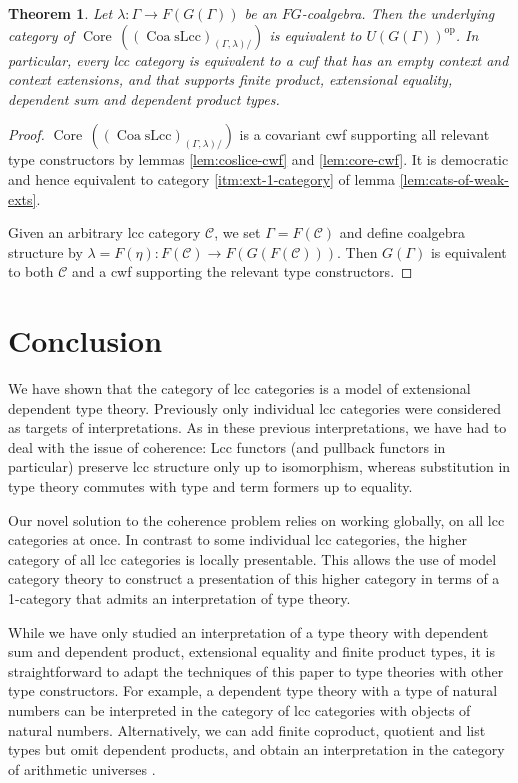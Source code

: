 \documentclass[a4paper]{article}
\newtheorem{theorem}{Theorem}
\theoremstyle{remark}
\theoremstyle{definition}
\begin{document}
\begin{theorem}
  \label{th:context-as-model}
  Let $\lambda : \Gamma \rightarrow F(G(\Gamma))$ be an $FG$-coalgebra.
  Then the underlying category of $\operatorname{Core} \, ((\operatorname{Coa} \mathrm{sLcc})_{(\Gamma, \lambda) /})$ is equivalent to $U(G(\Gamma))^\mathrm{op}$.
  In particular, every lcc category is equivalent to a cwf that has an empty context and context extensions, and that supports finite product, extensional equality, dependent sum and dependent product types.
\end{theorem}
\begin{proof}
  $\operatorname{Core} \, ((\operatorname{Coa} \mathrm{sLcc})_{(\Gamma, \lambda) /})$ is a covariant cwf supporting all relevant type constructors by lemmas \ref{lem:coslice-cwf} and \ref{lem:core-cwf}.
  It is democratic and hence equivalent to category \ref{itm:ext-1-category} of lemma \ref{lem:cats-of-weak-exts}.

  Given an arbitrary lcc category $\mathcal{C}$, we set $\Gamma = F(\mathcal{C})$ and define coalgebra structure by $\lambda = F(\eta) : F(\mathcal{C}) \rightarrow F(G(F(\mathcal{C})))$.
  Then $G(\Gamma)$ is equivalent to both $\mathcal{C}$ and a cwf supporting the relevant type constructors.
\end{proof}

\section{Conclusion}

We have shown that the category of lcc categories is a model of extensional dependent type theory.
Previously only individual lcc categories were considered as targets of interpretations.
As in these previous interpretations, we have had to deal with the issue of coherence:
Lcc functors (and pullback functors in particular) preserve lcc structure only up to isomorphism, whereas substitution in type theory commutes with type and term formers up to equality.

Our novel solution to the coherence problem relies on working globally, on all lcc categories at once.
In contrast to some individual lcc categories, the higher category of all lcc categories is locally presentable.
This allows the use of model category theory to construct a presentation of this higher category in terms of a 1-category that admits an interpretation of type theory.

While we have only studied an interpretation of a type theory with dependent sum and dependent product, extensional equality and finite product types, it is straightforward to adapt the techniques of this paper to type theories with other type constructors.
For example, a dependent type theory with a type of natural numbers can be interpreted in the category of lcc categories with objects of natural numbers.
Alternatively, we can add finite coproduct, quotient and list types but omit dependent products, and obtain an interpretation in the category of arithmetic universes \citep{au-as-list-arithmetic-pretopos,au-sketches}.
\end{document}

